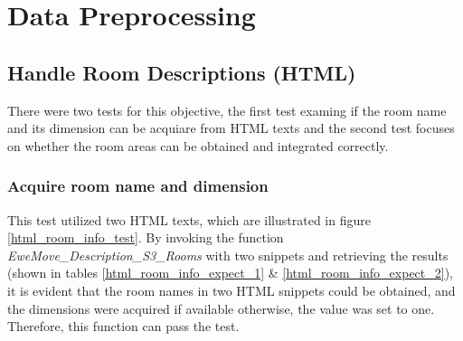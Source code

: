 \documentclass[12pt,twoside]{report}
\begin{document}
\section{Data Preprocessing}

\subsection{Handle Room Descriptions (HTML)}
There were two tests for this objective, the first test examing if the room name and its dimension can be acquiare from HTML texts and the second test focuses on whether the room areas can be obtained and integrated correctly. 

\subsubsection{Acquire room name and dimension}
This test utilized two HTML texts, which are illustrated in figure \ref{html_room_info_test}. By invoking the function \textit{EweMove\_Description\_S3\_Rooms} with two snippets and retrieving the results (shown in tables \ref{html_room_info_expect_1} \& \ref{html_room_info_expect_2}), it is evident that the room names in two HTML snippets could be obtained, and the dimensions were acquired if available otherwise, the value was set to one. Therefore, this function can pass the test.
\end{document}
